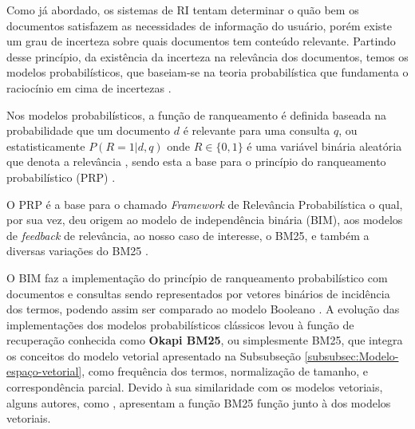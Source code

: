         
        Como já abordado, os sistemas de RI tentam determinar o quão bem os documentos satisfazem as necessidades de informação do usuário, porém existe um grau de incerteza sobre quais documentos tem conteúdo relevante. 
        Partindo desse princípio, da existência da incerteza na relevância dos documentos, temos os modelos probabilísticos, que baseiam-se na teoria probabilística que fundamenta o raciocínio em cima de incertezas \cite[p.~201]{Manning2008IIR}. 
        
        Nos modelos probabilísticos, a função de ranqueamento é definida baseada na probabilidade que um documento $d$ é relevante para uma consulta $q$, ou estatisticamente $P(R = 1| d,q)$ onde $R \in \{0, 1\}$ é uma variável binária aleatória que denota a relevância \cite[p.~111--112]{Zhai2016TDMA}, sendo esta a base para o princípio do ranqueamento probabilístico (PRP) \cite[p.~203]{Manning2008IIR}.
        
        O PRP é a base para o chamado \textit{Framework} de Relevância Probabilística o qual, por sua vez, deu origem ao modelo de independência binária (BIM), aos modelos de \textit{feedback} de relevância, ao nosso caso de interesse, o BM25, e também a diversas variações do BM25 \cite[p.~333]{robertson_probabilistic_2010}. 
        
        O BIM faz a implementação do princípio de ranqueamento probabilístico com documentos e consultas sendo representados por vetores binários de incidência dos termos, podendo assim ser comparado ao modelo Booleano \cite[p.~204]{Manning2008IIR}.
        A evolução das implementações dos modelos probabilísticos clássicos levou à função de recuperação conhecida como \textbf{Okapi BM25}, ou simplesmente BM25, que integra os conceitos do modelo vetorial apresentado na Subsubseção \ref{subsubsec:Modelo-espaço-vetorial}, como frequência dos termos, normalização de tamanho, e correspondência parcial.
        Devido à sua similaridade com os modelos vetoriais, alguns autores, como , apresentam a função BM25 função junto à dos modelos vetoriais.
        
